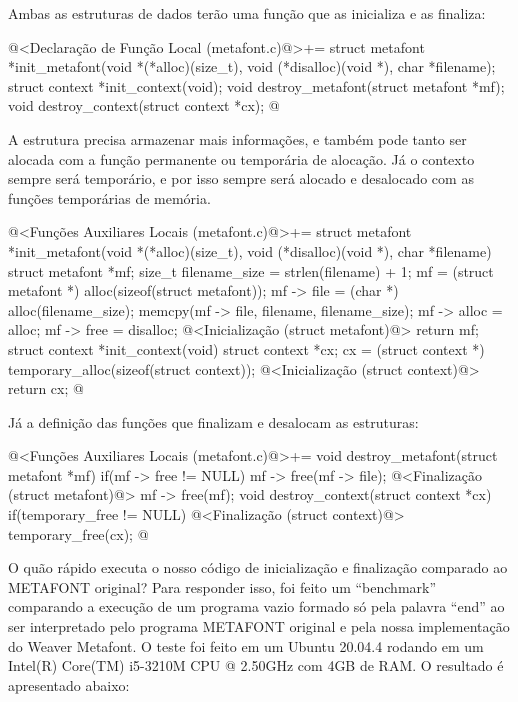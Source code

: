 Ambas as estruturas de dados terão uma função que as inicializa e as
finaliza:

\iniciocodigo
@<Declaração de Função Local (metafont.c)@>+=
struct metafont *init_metafont(void *(*alloc)(size_t),
                              void (*disalloc)(void *),
                              char *filename);
struct context *init_context(void);
void destroy_metafont(struct metafont *mf);
void destroy_context(struct context *cx);
@
\fimcodigo

A estrutura  precisa armazenar mais informações,
e também pode tanto ser alocada com a função permanente ou temporária
de alocação. Já o contexto sempre será temporário, e por isso sempre
será alocado e desalocado com as funções temporárias de memória.

\iniciocodigo
@<Funções Auxiliares Locais (metafont.c)@>+=
struct metafont *init_metafont(void *(*alloc)(size_t),
                              void (*disalloc)(void *),
                              char *filename){
  struct metafont *mf;
  size_t filename_size = strlen(filename) + 1;
  mf = (struct metafont *) alloc(sizeof(struct metafont));
  mf -> file = (char *) alloc(filename_size);
  memcpy(mf -> file, filename, filename_size);
  mf -> alloc = alloc;
  mf -> free = disalloc;
  @<Inicialização (struct metafont)@>
  return mf;
}
struct context *init_context(void){
  struct context *cx;
  cx = (struct context *) temporary_alloc(sizeof(struct context));
  @<Inicialização (struct context)@>
  return cx;
}
@
\fimcodigo

Já a definição das funções que finalizam e desalocam as estruturas:

\iniciocodigo
@<Funções Auxiliares Locais (metafont.c)@>+=
void destroy_metafont(struct metafont *mf){
  if(mf -> free != NULL){
    mf -> free(mf -> file);
    @<Finalização (struct metafont)@>
    mf -> free(mf);
  }
}
void destroy_context(struct context *cx){
  if(temporary_free != NULL){
    @<Finalização (struct context)@>
    temporary_free(cx);
  }
}
@
\fimcodigo

O quão rápido executa o nosso código de inicialização e finalização
comparado ao METAFONT original? Para responder isso, foi feito um
``benchmark'' comparando a execução de um programa vazio formado só
pela palavra ``end'' ao ser interpretado pelo programa METAFONT
original e pela nossa implementação do Weaver Metafont. O teste foi
feito em um Ubuntu 20.04.4 rodando em um Intel(R) Core(TM) i5-3210M
CPU @ 2.50GHz com 4GB de RAM. O resultado é apresentado abaixo:


